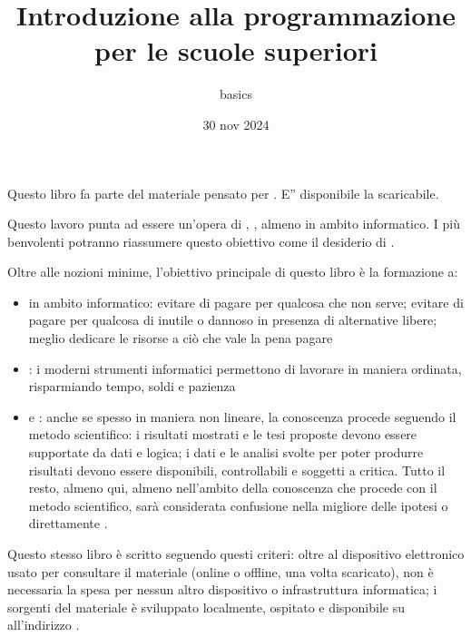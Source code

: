 \documentclass[letterpaper,10pt,italian]{jupyterBook}
\title{Introduzione alla programmazione per le scuole superiori}
\date{30 nov 2024}
\author{basics}
\begin{document}
\pagestyle{empty}
\sphinxmaketitle
\pagestyle{plain}
\sphinxtableofcontents
\pagestyle{normal}
\label{\detokenize{intro::doc}}


\sphinxAtStartPar
Questo libro fa parte del materiale pensato per . E” disponibile la  scaricabile.

\sphinxAtStartPar
{} Questo lavoro punta ad essere un’opera di  ,   , almeno in ambito informatico. I più benvolenti potranno riassumere questo obiettivo come il desiderio di .

\sphinxAtStartPar
Oltre alle nozioni minime, l’obiettivo principale di questo libro è la formazione a:
\begin{itemize}
\item {} 
\sphinxAtStartPar
{} in ambito informatico: evitare di pagare per qualcosa che non serve; evitare di pagare per qualcosa di inutile o dannoso in presenza di alternative libere; meglio dedicare le risorse a ciò che vale la pena pagare

\item {} 
\sphinxAtStartPar
{}: i moderni strumenti informatici permettono di lavorare in maniera ordinata, risparmiando tempo, soldi e pazienza

\item {} 
\sphinxAtStartPar
{} e : anche se spesso in maniera non lineare, la conoscenza procede seguendo il metodo scientifico: i risultati mostrati e le tesi proposte devono essere supportate da dati e logica; i dati e le analisi svolte per poter produrre risultati devono essere disponibili, controllabili e soggetti a critica. Tutto il resto, almeno qui, almeno nell’ambito della conoscenza che procede con il metodo scientifico, sarà considerata confusione nella migliore delle ipotesi o direttamente .

\end{itemize}

\sphinxAtStartPar
Questo stesso libro è scritto seguendo questi criteri: oltre al dispositivo elettronico usato per consultare il materiale (online o offline, una volta scaricato), non è necessaria la spesa per nessun altro dispositivo o infrastruttura informatica; i sorgenti del materiale è sviluppato localmente, ospitato e disponibile su  all’indirizzo .
\end{document}
